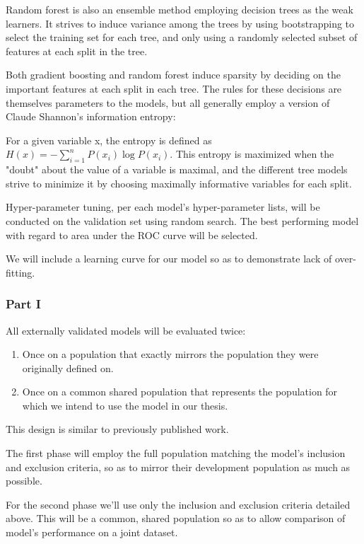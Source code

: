 \documentclass[a4paper,12pt]{article}
\begin{document}
		Random forest is also an ensemble method employing decision trees as the weak learners. It strives to induce variance among the trees by using bootstrapping to select the training set for each tree, and only using a randomly selected subset of features at each split in the tree.
		
		Both gradient boosting and random forest induce sparsity by deciding on the important features at each split in each tree. The rules for these decisions are themselves parameters to the models, but all generally employ a version of Claude Shannon's information entropy\cite{Shannon1948}:
		
		For a given variable x, the entropy is defined as $ H(x) = -\sum_{i=1}^{n} P(x_i) \log P(x_i)$. This entropy is maximized when the "doubt" about the value of a variable is maximal, and the different tree models strive to minimize it by choosing maximally informative variables for each split.
		
		Hyper-parameter tuning, per each model's hyper-parameter lists, will be conducted on the validation set using random search\cite{Bergstra2012}. The best performing model with regard to area under the ROC curve will be selected.
		
		We will include a learning curve for our model so as to demonstrate lack of over-fitting.
	
		\subsubsection{Part I}

		All externally validated models will be evaluated twice:
		\begin{enumerate}
			\item Once on a population that exactly mirrors the population they were originally defined on.
			\item Once on a common shared population that represents the population for which we intend to use the model in our thesis.
		\end{enumerate}
		This design is similar to previously published work\cite{Dagan2017}.
		
		The first phase will employ the full population matching the model's inclusion and exclusion criteria, so as to mirror their development population as much as possible.
		
		For the second phase we'll use only the inclusion and exclusion criteria detailed above. This will be a common, shared population so as to allow comparison of model's performance on a joint dataset.
		
\end{document}
